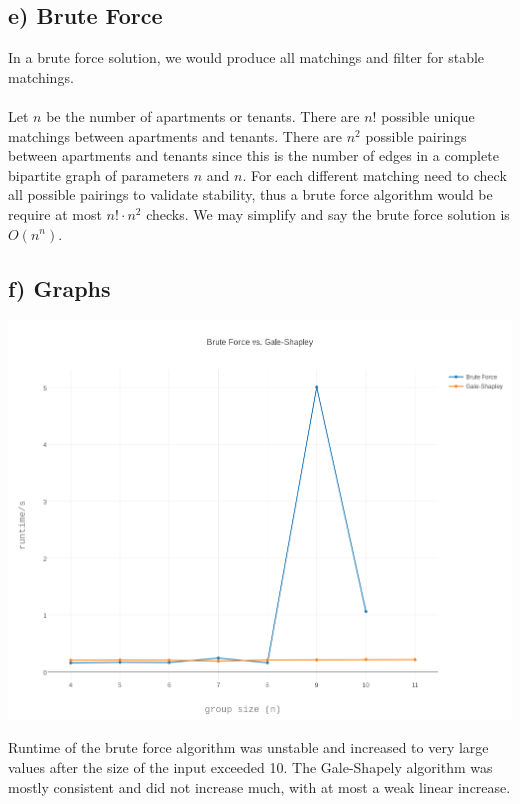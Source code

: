 \documentclass{article}
\begin{document}
\subsection*{e) Brute Force}
In a brute force solution, we would produce all matchings and filter for
stable matchings.
\\\\
Let $n$ be the number of apartments or tenants. There are
$n!$ possible unique matchings between apartments and tenants. There are $n^2$
possible pairings between apartments and tenants since this is the number of
edges in a complete bipartite graph of parameters $n$ and $n$. For each
different matching need to check all possible pairings to validate stability,
thus a brute force algorithm would be require at most $n! \cdot n^2$ checks.
We may simplify and say the brute force solution is $O(n^n)$.


\newpage

\subsection*{f) Graphs}
\includegraphics[width=\linewidth]{../graph/plot.png}

Runtime of the brute force algorithm was unstable and increased to very large
values after the size of the input exceeded 10. The Gale-Shapely algorithm was
mostly consistent and did not increase much, with at most a weak linear
increase.
\end{document}
